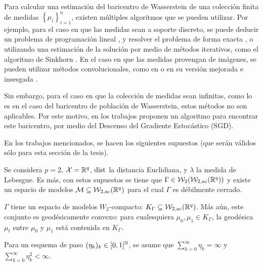 Para calcular una estimación del baricentro de Wasserstein de una colección finita de medidas $\left\{ \mu_i \right\}_{i=1}^{n}$, existen múltiples algoritmos que se pueden utilizar. Por ejemplo, para el caso en que las medidas sean a soporte discreto, se puede deducir un problema de programación lineal \cite[ver Cap. 3]{peyre2019computational}, y resolver el problema de forma exacta \cite{bonneel2011displacement}, o utilizando una estimación de la solución por medio de métodos iterativos, como el algoritmo de Sinkhorn \cite{cuturi2013sinkhorn}. En el caso en que las medidas provengan de imágenes, se pueden utilizar métodos convolucionales, como en \cite{solomon2015convolutional} o en su versión mejorada e insesgada \cite{janati2020debiased}.

Sin embargo, para el caso en que la colección de medidas sean infinitas, como lo es en el caso del baricentro de población de Wasserstein, estos métodos no son aplicables. Por este motivo, en los trabajos \cite{rios2020contributions,backhoff2022stochastic,backhoff2022bayesian} proponen un algoritmo para encontrar este baricentro, por medio del Descenso del Gradiente Estocástico (SGD).

En los trabajos mencionados, se hacen los siguientes supuestos (que serán válidos sólo para esta sección de la tesis).

\begin{assumption}\label{assump:caso-particular-lebesgue}
    Se considera $p=2$, $\cX = \R^q$, $\dist$ la distancia Euclidiana, y $\lambda$ la medida de Lebesgue. Es más, con estos supuestos se tiene que $\Gamma \in \WassersteinSpace[2]{\WassersteinSpace[2,\mathrm{ac}]{\R^q} } $ y existe un espacio de modelos $\Models \subseteq \WassersteinSpace[2, \mathrm{ac}]{\R^q} $ para el cual $\Gamma$ es débilmente cerrado.
\end{assumption}

\begin{assumption}\label{assump:caso-particular-geodesicamente-convexo}
    $\Gamma$ tiene un espacio de modelos $W_2$-compacto: $K_\Gamma \subseteq \WassersteinSpace[2,\mathrm{ac}]{\R^q} $. Más aún, este conjunto es geodésicamente convexo: para cualesquiera $\mu_0, \mu_1 \in K_\Gamma$, la geodésica $\mu_t$ entre $\mu_0$ y $\mu_1$ está contenida en $K_\Gamma$.
\end{assumption}

\begin{assumption}\label{assump:caso-particular-esquema-paso-L1-L2}

    Para un esquema de paso $(\eta_k)_k \in [0, 1]^\N$, se asume que $\sum_{k=0}^{\infty} \eta_k = \infty$ y $\sum_{k=0}^{\infty} \eta_k^2 < \infty$.

\end{assumption}

